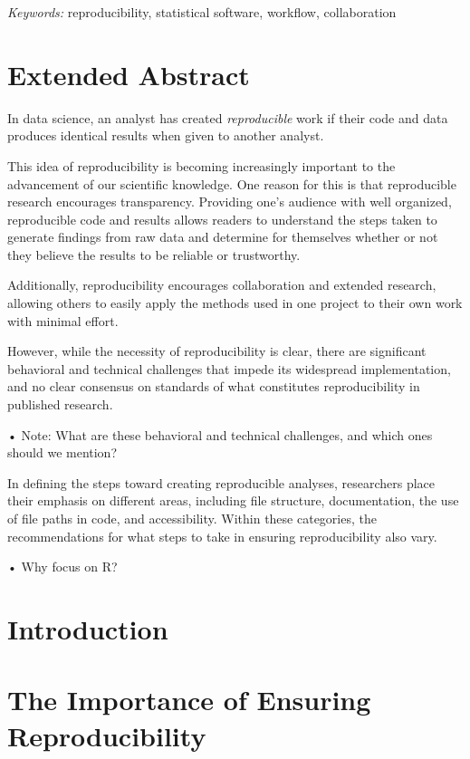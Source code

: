 \documentclass[12pt]{article}
\begin{document}
\noindent%
{\it Keywords:} reproducibility, statistical software, workflow, collaboration
\vfill

\newpage
{} %

\section{Extended Abstract}\label{extended-abstract}

In data science, an analyst has created \emph{reproducible} work if
their code and data produces identical results when given to another
analyst.

This idea of reproducibility is becoming increasingly important to the
advancement of our scientific knowledge. One reason for this is that
reproducible research encourages transparency. Providing one's audience
with well organized, reproducible code and results allows readers to
understand the steps taken to generate findings from raw data and
determine for themselves whether or not they believe the results to be
reliable or trustworthy.

Additionally, reproducibility encourages collaboration and extended
research, allowing others to easily apply the methods used in one
project to their own work with minimal effort.

However, while the necessity of reproducibility is clear, there are
significant behavioral and technical challenges that impede its
widespread implementation, and no clear consensus on standards of what
constitutes reproducibility in published research.

• Note: What are these behavioral and technical challenges, and which
ones should we mention?

In defining the steps toward creating reproducible analyses, researchers
place their emphasis on different areas, including file structure,
documentation, the use of file paths in code, and accessibility. Within
these categories, the recommendations for what steps to take in ensuring
reproducibility also vary.

• Why focus on R?

\section{Introduction}\label{introduction}

\section{The Importance of Ensuring
Reproducibility}\label{the-importance-of-ensuring-reproducibility}
\end{document}
